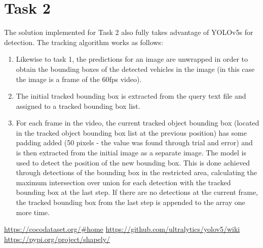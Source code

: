 \documentclass{article}
\begin{document}
\section{Task 2}
The solution implemented for Task 2 also fully takes advantage of YOLOv5s for detection. The tracking algorithm works as follows:
\begin{enumerate}
	\item Likewise to task 1, the predictions for an image are unwrapped in order to obtain the bounding boxes of the detected vehicles in the image (in this case the image is a frame of the 60fps video).
	\item The initial tracked bounding box is extracted from the query text file and assigned to a tracked bounding box list.
	\item For each frame in the video, the current tracked object bounding box (located in the tracked object bounding box list at the previous position) has some padding added (50 pixels - the value was found through trial and error) and is then extracted from the initial image as a separate image. The model is used to detect the position of the new bounding box. This is done achieved through detections of the bounding box in the restricted area, calculating the maximum intersection over union for each detection with the tracked bounding box at the last step. If there are no detections at the current frame, the tracked bounding box from the last step is appended to the array one more time.
\end{enumerate}

\newpage

\begin{thebibliography}{1.7} 
	 \color{cyan}\url{https://cocodataset.org/#home} \color{black}
	 \color{cyan}\url{https://github.com/ultralytics/yolov5/wiki} \color{black}
	 \color{cyan}\url{https://pypi.org/project/shapely/} \color{black}
	
	
\end{thebibliography}
\end{document}
